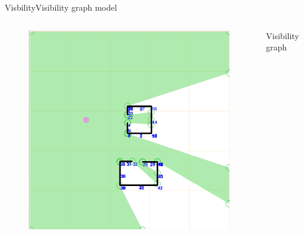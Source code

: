 \begin{frame}{Visbility}{Visibility graph model}

\begin{columns}
\begin{figure}
\centering
\includegraphics[width = \textwidth]{./screenshot/visibility_graph.png}
\end{figure}

\begin{minipage}{\textwidth}
Visibility graph
\end{minipage}
\end{columns}

\end{frame}
